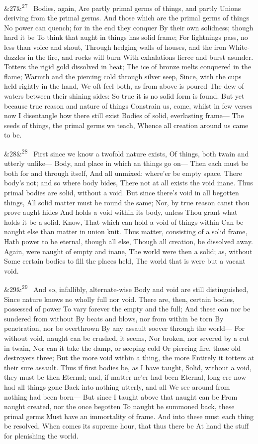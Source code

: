 \documentclass[12pt]{article}
\newcommand{\para}[1][]{\par\noindent\ifx&#1&\else\textsuperscript{\footnotesize #1}~\fi}
\begin{document}
\para[27] Bodies, again, Are partly primal germs of things, and partly Unions deriving from the primal germs. And those which are the primal germs of things No power can quench; for in the end they conquer By their own solidness; though hard it be To think that aught in things has solid frame; For lightnings pass, no less than voice and shout, Through hedging walls of houses, and the iron White-dazzles in the fire, and rocks will burn With exhalations fierce and burst asunder. Totters the rigid gold dissolved in heat; The ice of bronze melts conquered in the flame; Warmth and the piercing cold through silver seep, Since, with the cups held rightly in the hand, We oft feel both, as from above is poured The dew of waters between their shining sides: So true it is no solid form is found. But yet because true reason and nature of things Constrain us, come, whilst in few verses now I disentangle how there still exist Bodies of solid, everlasting frame--- The seeds of things, the primal germs we teach, Whence all creation around us came to be.

\para[28] First since we know a twofold nature exists, Of things, both twain and utterly unlike--- Body, and place in which an things go on--- Then each must be both for and through itself, And all unmixed: where'er be empty space, There body's not; and so where body bides, There not at all exists the void inane. Thus primal bodies are solid, without a void. But since there's void in all begotten things, All solid matter must be round the same; Nor, by true reason canst thou prove aught hides And holds a void within its body, unless Thou grant what holds it be a solid. Know, That which can hold a void of things within Can be naught else than matter in union knit. Thus matter, consisting of a solid frame, Hath power to be eternal, though all else, Though all creation, be dissolved away. Again, were naught of empty and inane, The world were then a solid; as, without Some certain bodies to fill the places held, The world that is were but a vacant void.

\para[29] And so, infallibly, alternate-wise Body and void are still distinguished, Since nature knows no wholly full nor void. There are, then, certain bodies, possessed of power To vary forever the empty and the full; And these can nor be sundered from without By beats and blows, nor from within be torn By penetration, nor be overthrown By any assault soever through the world--- For without void, naught can be crushed, it seems, Nor broken, nor severed by a cut in twain, Nor can it take the damp, or seeping cold Or piercing fire, those old destroyers three; But the more void within a thing, the more Entirely it totters at their sure assault. Thus if first bodies be, as I have taught, Solid, without a void, they must be then Eternal; and, if matter ne'er had been Eternal, long ere now had all things gone Back into nothing utterly, and all We see around from nothing had been born--- But since I taught above that naught can be From naught created, nor the once begotten To naught be summoned back, these primal germs Must have an immortality of frame. And into these must each thing be resolved, When comes its supreme hour, that thus there be At hand the stuff for plenishing the world.
\end{document}
